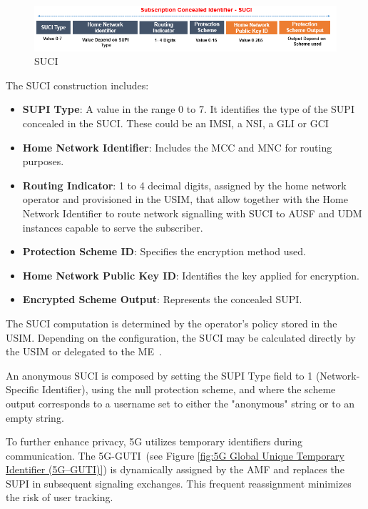 \begin{figure}
    \centering
    \includegraphics[width=0.75\linewidth]{figs/Subscription Concealed Identifier (SUCI).png}
    \caption{\ac{SUCI}}
    \label{fig:Subscription Concealed Identifier (SUCI)}
\end{figure}

The \ac{SUCI} construction includes:
\begin{itemize}
    \item{
        \textbf{\ac{SUPI} Type}: A value in the range 0 to 7. It identifies the type of the \ac{SUPI} concealed in the \ac{SUCI}. These could be an \ac{IMSI}, a \ac{NSI}, a \ac{GLI} or \ac{GCI}
    }
    \item{
        \textbf{Home Network Identifier}: Includes the \ac{MCC} and \ac{MNC} for routing purposes.
    }
    \item{
        \textbf{Routing Indicator}: 1 to 4 decimal digits, assigned by the home network operator and provisioned in the \ac{USIM}, that allow together with the Home Network Identifier to route network signalling with \ac{SUCI} to \ac{AUSF} and \ac{UDM} instances capable to serve the subscriber.
    }
    \item{
        \textbf{Protection Scheme ID}: Specifies the encryption method used.
    }
    \item{
        \textbf{Home Network Public Key ID}: Identifies the key applied for encryption.
    }
    \item{
        \textbf{Encrypted Scheme Output}: Represents the concealed \ac{SUPI}.
    }
\end{itemize}

The \ac{SUCI} computation is determined by the operator's policy stored in the \ac{USIM}. Depending on the configuration, the \ac{SUCI} may be calculated directly by the \ac{USIM} or delegated to the \ac{ME}~\cite{23.003-p21}.

An anonymous \ac{SUCI} is composed by setting the \ac{SUPI} Type field to 1 (Network-Specific Identifier), using the null protection scheme, and where the scheme output corresponds to a username set to either the "anonymous" string or to an empty string.

To further enhance privacy, \ac{5G} utilizes temporary identifiers during communication. The \acl{5G-GUTI}~\cite{23.501-p244}(see Figure \ref{fig:5G Global Unique Temporary Identifier (5G–GUTI)}) is dynamically assigned by the \ac{AMF} and replaces the \ac{SUPI} in subsequent signaling exchanges. This frequent reassignment minimizes the risk of user tracking.

